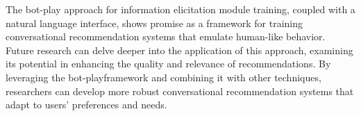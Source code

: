 The bot-play approach for information elicitation module training, coupled with a natural language interface, shows promise as a framework for training conversational recommendation systems that emulate human-like behavior. Future research can delve deeper into the application of this approach, examining its potential in enhancing the quality and relevance of recommendations. By leveraging the bot-playframework and combining it with other techniques, researchers can develop more robust conversational recommendation systems that adapt to users' preferences and needs.